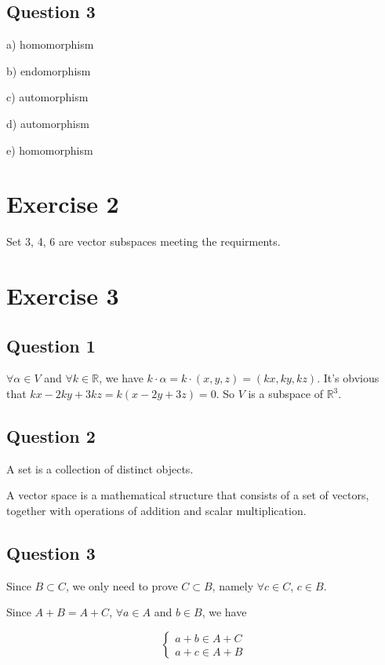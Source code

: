 \documentclass{article}
\begin{document}
\subsection{Question 3}

a) homomorphism

b) endomorphism

c) automorphism

d) automorphism

e) homomorphism

\section{Exercise 2}

Set 3, 4, 6 are vector subspaces meeting the requirments.

\section{Exercise 3}

\subsection{Question 1}

$\forall \alpha \in V$ and $\forall k \in \mathbb{R}$, we have $k\cdot \alpha=k\cdot (x,y,z)=(kx,ky,kz)$. It's obvious that $kx-2ky+3kz=k(x-2y+3z)=0$. So $V$ is a subspace of $\mathbb{R}^{3}$.

\subsection{Question 2}

A set is a collection of distinct objects.

A vector space is a mathematical structure that consists of a set of vectors, together with operations of addition and scalar multiplication.

\subsection{Question 3}

Since $B\subset C$, we only need to prove $C\subset B$, namely $\forall c\in C$, $c\in B$.

Since $A+B=A+C$, $\forall a\in A$ and $b\in B$, we have

\begin{equation*}
\left\{\begin{aligned}
a+b\in A+C\\
a+c\in A+B
\end{aligned}
\right.
\end{equation*}
\end{document}
